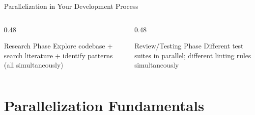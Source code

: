 \documentclass[aspectratio=169,11pt]{beamer}
\begin{document}
\begin{frame}{Parallelization in Your Development Process}
    \vspace{0.3cm}
    \begin{columns}[T]
        \begin{column}{0.48\textwidth}
            \begin{block}{Research Phase}
                \footnotesize
                Explore codebase + search literature + identify patterns (all simultaneously)
            \end{block}
        \end{column}
        \begin{column}{0.48\textwidth}
            \begin{block}{Review/Testing Phase}
                \footnotesize
                Different test suites in parallel; different linting rules simultaneously
            \end{block}
        \end{column}
    \end{columns}
\end{frame}

\section{Parallelization Fundamentals}
\end{document}
